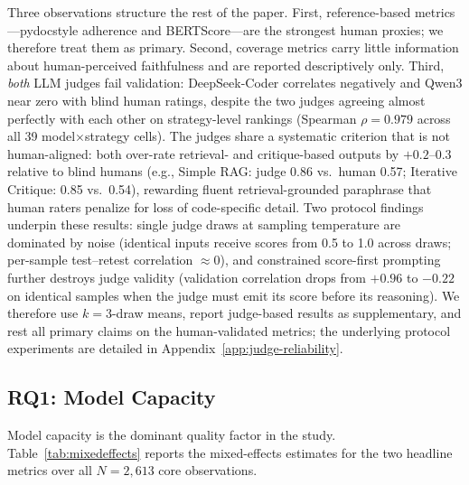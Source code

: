 \documentclass[pdflatex,sn-mathphys-ay]{sn-jnl}%
\theoremstyle{thmstyleone}%
\theoremstyle{thmstyletwo}%
\theoremstyle{thmstylethree}%
\begin{document}
{Three observations structure the rest of the paper. First, reference-based metrics---pydocstyle adherence and BERTScore---are the strongest human proxies; we therefore treat them as primary. Second, coverage metrics carry little information about human-perceived faithfulness and are reported descriptively only. Third, \emph{both} LLM judges fail validation: DeepSeek-Coder correlates negatively and Qwen3 near zero with blind human ratings, despite the two judges agreeing almost perfectly with each other on strategy-level rankings (Spearman $\rho = 0.979$ across all 39 model$\times$strategy cells). The judges share a systematic criterion that is not human-aligned: both over-rate retrieval- and critique-based outputs by $+0.2$--$0.3$ relative to blind humans (e.g., Simple RAG: judge 0.86 vs.\ human 0.57; Iterative Critique: 0.85 vs.\ 0.54), rewarding fluent retrieval-grounded paraphrase that human raters penalize for loss of code-specific detail. Two protocol findings underpin these results: single judge draws at sampling temperature are dominated by noise (identical inputs receive scores from 0.5 to 1.0 across draws; per-sample test--retest correlation $\approx 0$), and constrained score-first prompting further destroys judge validity (validation correlation drops from $+0.96$ to $-0.22$ on identical samples when the judge must emit its score before its reasoning). We therefore use $k{=}3$-draw means, report judge-based results as supplementary, and rest all primary claims on the human-validated metrics; the underlying protocol experiments are detailed in Appendix~\ref{app:judge-reliability}.

\subsection{RQ1: Model Capacity}
\label{sec:rq1}
Model capacity is the dominant quality factor in the study. Table~\ref{tab:mixedeffects} reports the mixed-effects estimates for the two headline metrics over all $N{=}2{,}613$ core observations.

}
\end{document}
